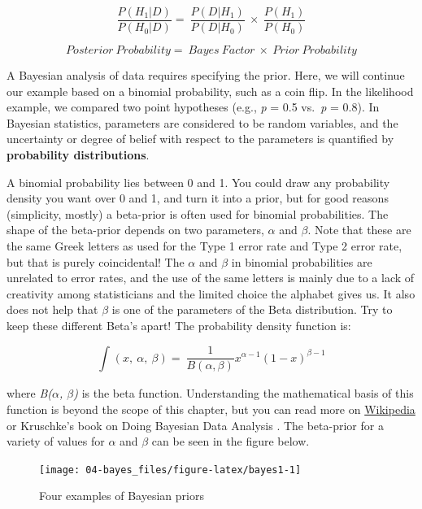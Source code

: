 \documentclass[
  oneside]{book}
\begin{document}
\[
\frac{P(H_1|D)}{P(H_0|D)} = \ \frac{P(D|H_1)}{P(D|H_0)}\  \times \ \frac{P(H_1)}{P(H_0)}
\]

\[
Posterior\ Probability = \ Bayes\ Factor\  \times \ Prior\ Probability
\]

A Bayesian analysis of data requires specifying the prior. Here, we will continue our example based on a binomial probability, such as a coin flip. In the likelihood example, we compared two point hypotheses (e.g., \emph{p} = 0.5 vs.~\emph{p} = 0.8). In Bayesian statistics, parameters are considered to be random variables, and the uncertainty or degree of belief with respect to the parameters is quantified by \textbf{probability distributions}.

A binomial probability lies between 0 and 1. You could draw any probability density you want over 0 and 1, and turn it into a prior, but for good reasons (simplicity, mostly) a beta-prior is often used for binomial probabilities. The shape of the beta-prior depends on two parameters, \(\alpha\) and \(\beta\). Note that these are the same Greek letters as used for the Type 1 error rate and Type 2 error rate, but that is purely coincidental! The \(\alpha\) and \(\beta\) in binomial probabilities are unrelated to error rates, and the use of the same letters is mainly due to a lack of creativity among statisticians and the limited choice the alphabet gives us. It also does not help that \(\beta\) is one of the parameters of the Beta distribution. Try to keep these different Beta's apart! The probability density function is:

\[
\int_{}^{}{\left( x,\ \alpha,\ \beta \right) = \ \frac{1}{B(\alpha,\beta)}}x^{\alpha - 1}{(1 - x)}^{\beta - 1}
\]

where \emph{B(\(\alpha\), \(\beta\))} is the beta function. Understanding the mathematical basis of this function is beyond the scope of this chapter, but you can read more on \href{https://en.wikipedia.org/wiki/Beta_distribution}{Wikipedia} or Kruschke's book on Doing Bayesian Data Analysis \citep{kruschke_doing_2014}. The beta-prior for a variety of values for \(\alpha\) and \(\beta\) can be seen in the figure below.



\begin{figure}

{\centering \texttt{[image: 04-bayes\_files/figure-latex/bayes1-1]} 

}

\caption{Four examples of Bayesian priors}\label{fig:bayes1}
\end{figure}
\end{document}
